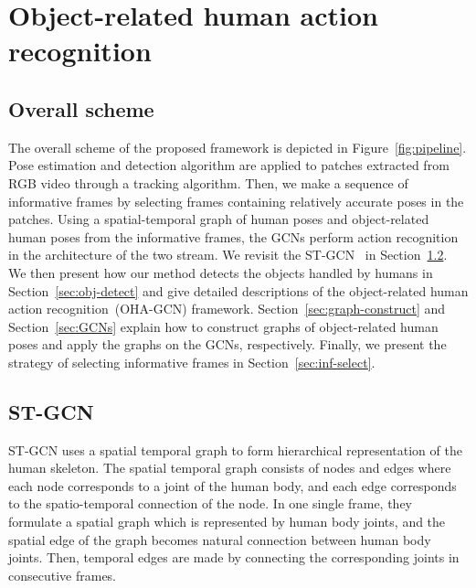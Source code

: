 \documentclass[10pt,twocolumn,letterpaper]{article}
\begin{document}
\section{Object-related  human  action recognition}

\subsection{Overall scheme}
\label{sec:overall}
The overall scheme of the proposed framework is depicted in Figure~\ref{fig:pipeline}. Pose estimation and detection algorithm are applied to patches extracted from RGB video through a tracking algorithm. 
Then, we make a sequence of informative frames by selecting frames containing relatively accurate poses in the patches. 
Using a spatial-temporal graph of human poses and object-related human poses from the informative frames, the GCNs perform action recognition
in the architecture of the two stream. 
We revisit the ST-GCN~\cite{stgcn2018aaai} in Section~\ref{sec:gcn-review}.
We then present how our method detects the objects handled by humans in Section~\ref{sec:obj-detect} and give detailed descriptions of the object-related human action recognition~(OHA-GCN) framework.
Section~\ref{sec:graph-construct} and Section~\ref{sec:GCNs} explain how to construct graphs of object-related human poses and apply the graphs on the GCNs, respectively.
Finally, we present the strategy of selecting informative frames in Section~\ref{sec:inf-select}.
\subsection{ST-GCN \cite{stgcn2018aaai}}
\label{sec:gcn-review}
ST-GCN uses a spatial temporal graph to form hierarchical representation of the human skeleton. 
The spatial temporal graph consists of nodes and edges where each node corresponds to a joint of the human body, and each edge corresponds to the spatio-temporal connection of the node.
In one single frame, they formulate a spatial graph which is represented by human body joints, and the spatial edge of the graph becomes natural connection between human body joints.
Then, temporal edges are made by connecting the corresponding joints in consecutive frames.
\end{document}
